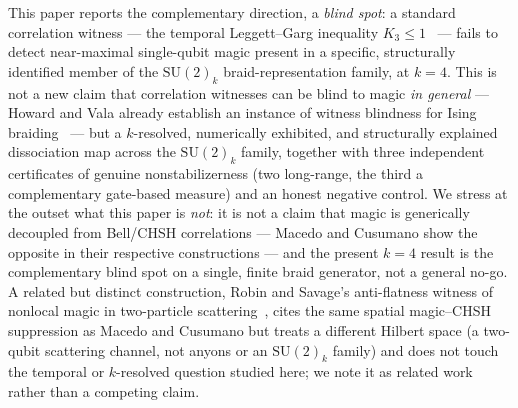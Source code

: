 \documentclass[aps,pra,twocolumn,superscriptaddress,longbibliography,floatfix,nofootinbib]{revtex4-2}
\begin{document}
This paper reports the complementary direction, a \emph{blind spot}:
a standard correlation witness --- the temporal Leggett--Garg
inequality $K_3\le1$~\cite{LeggettGarg1985,Budroni2014} --- fails to
detect near-maximal single-qubit magic present in a specific,
structurally identified member of the $\mathrm{SU}(2)_k$
braid-representation family, at $k=4$. This is not a new claim that
correlation witnesses can be blind to magic \emph{in general} ---
Howard and Vala already establish an instance of witness blindness for
Ising braiding~\cite{HowardVala2012} --- but a $k$-resolved,
numerically exhibited, and structurally explained dissociation map
across the $\mathrm{SU}(2)_k$ family, together with three independent
certificates of genuine nonstabilizerness (two long-range, the third
a complementary gate-based measure) and an honest negative
control. We stress at the outset what this paper is \emph{not}: it is
not a claim that magic is generically decoupled from Bell/CHSH
correlations --- Macedo and Cusumano show the opposite in their
respective constructions --- and the present $k=4$ result is the
complementary blind spot on a single, finite braid generator, not a
general no-go. A related but distinct construction, Robin and
Savage's anti-flatness witness of nonlocal magic in two-particle
scattering~\cite{RobinSavage2025}, cites the same spatial
magic--CHSH suppression as Macedo and Cusumano but treats a
different Hilbert space (a two-qubit scattering channel, not anyons
or an $\mathrm{SU}(2)_k$ family) and does not touch the temporal or
$k$-resolved question studied here; we note it as related work
rather than a competing claim.
\end{document}
